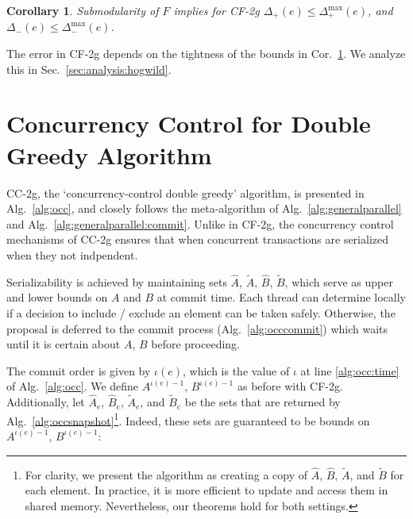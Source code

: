 \documentclass{article} %
\newcommand{\hogwild}{CF-2g}
\newcommand{\occ}{CC-2g}
\newtheorem{cor}[thm]{Corollary}
\newcommand{\Comments}{1}
\newcommand{\note}[2]{\ifnum\Comments=1\textcolor{#1}{#2}\fi}
\newcommand{\xinghao}[1]{\note{red}{[XP: #1]}}
\newcommand{\secref}[1]{Sec.~\ref{#1}}
\newcommand{\corref}[1]{Cor.~\ref{#1}}
\newcommand{\algref}[1]{Alg.~\ref{#1}}
\begin{document}
\begin{cor}\label{cor:hog:delta_bound}
Submodularity of $F$ implies for \hogwild{}
$\Delta_{+}(e) \leq \Delta_{+}^{\max}(e)$, and
$\Delta_{-}(e) \leq \Delta_{-}^{\max}(e)$.
\end{cor}

The error in \hogwild{} depends on the tightness of the bounds in \corref{cor:hog:delta_bound}.
We analyze this in \secref{sec:analysis:hogwild}.











\section{Concurrency Control for Double Greedy Algorithm \label{sec:algocc}}

\occ{}, the `concurrency-control double greedy' algorithm, is presented in \algref{alg:occ}, and closely follows the meta-algorithm of \algref{alg:generalparallel} and \algref{alg:generalparallel:commit}.
Unlike in \hogwild{}, the concurrency control mechanisms of \occ{} ensures that when concurrent transactions are serialized when they not indpendent.

Serializability is achieved by maintaining sets $\hat{A}$, $\tilde{A}$, $\hat{B}$, $\tilde{B}$, which serve as upper and lower bounds on $A$ and $B$ at commit time.
Each thread can determine locally if a decision to include / exclude an element can be taken safely.
Otherwise, the proposal is deferred to the commit process (\algref{alg:occcommit}) which waits until it is certain about $A$, $B$ before proceeding.

The commit order is given by $\iota(e)$, which is the value of $\iota$ at line \ref{alg:occ:time} of \algref{alg:occ}.
We define $A^{\iota(e)-1}$, $B^{\iota(e)-1}$ as before with \hogwild{}.
Additionally, let $\hat{A}_e$, $\hat{B}_e$, $\tilde{A}_e$, and $\tilde{B}_e$ be the sets that are returned by \algref{alg:occsnapshot}\footnote{
  For clarity, we present the algorithm as creating a copy of $\hat{A}$, $\hat{B}$, $\tilde{A}$, and $\tilde{B}$ for each element. In practice, it is more efficient to update and access them in shared memory. Nevertheless, our theorems hold for both settings.
}.
Indeed, these sets are guaranteed to be bounds on $A^{\iota(e)-1}$, $B^{\iota(e)-1}$:
\end{document}
